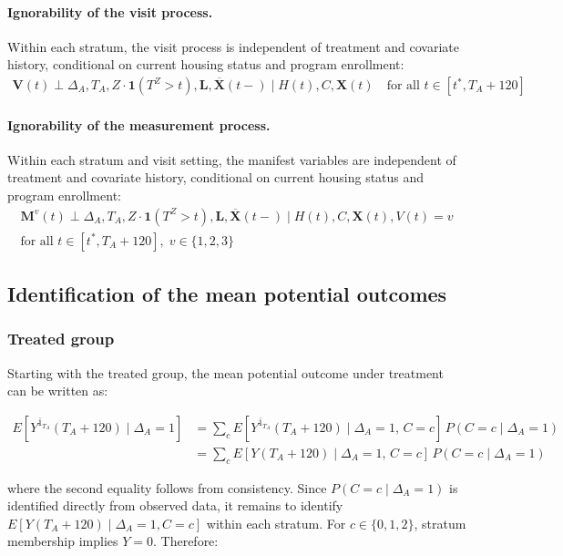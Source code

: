 \paragraph{Ignorability of the visit process.} Within each stratum, the visit process is independent of treatment and covariate history, conditional on current housing status and program enrollment:
\begin{align*}
    \boldsymbol{V}(t) \perp \Delta_A, T_A, Z\cdot\mathbf{1}(T^Z>t), \boldsymbol{L},  \overline{\boldsymbol{X}}(t-) \mid H(t), C, \boldsymbol{X}(t) \quad \text{for all } t \in [t^*, T_A + 120]
\end{align*}

\paragraph{Ignorability of the measurement process.} Within each stratum and visit setting, the manifest variables are independent of treatment and covariate history, conditional on current housing status and program enrollment:
\begin{align*}
    \boldsymbol{M}^{v}(t) \perp \Delta_A, T_A, Z\cdot\mathbf{1}(T^Z>t), \boldsymbol{L},  \overline{\boldsymbol{X}}(t-) \mid H(t), C, \boldsymbol{X}(t), V(t)=v \\
    \text{for all } t \in [t^*, T_A + 120],\; v \in \{1, 2, 3\}
\end{align*}

\subsection{Identification of the mean potential outcomes}

\subsubsection{Treated group}

Starting with the treated group, the mean potential outcome under treatment can be written as:

\begin{align*}
    E[Y^{\bar{1}_{T_A}}(T_A + 120)\mid \Delta_A=1]
    &= \sum_{c} E[Y^{\bar{1}_{T_A}}(T_A + 120)\mid \Delta_A=1,\, C=c]\, P(C=c\mid \Delta_A=1) \\
    &= \sum_{c} E[Y(T_A + 120)\mid \Delta_A=1,\, C=c]\, P(C=c\mid \Delta_A=1)
\end{align*}

where the second equality follows from consistency. Since $P(C=c\mid \Delta_A=1)$ is identified directly from observed data, it remains to identify $E[Y(T_A + 120)\mid \Delta_A=1, C=c]$ within each stratum. For $c \in \{0,1,2\}$, stratum membership implies $Y = 0$. Therefore:

